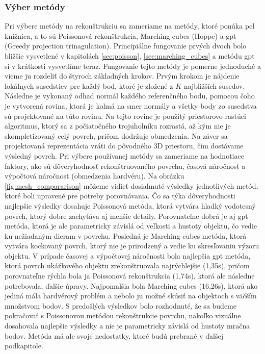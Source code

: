 \subsubsection{Výber metódy}
\noindent Pri výbere metódy na rekonštrukciu sa zameriame na metódy, ktoré ponúka \acrshort{pcl} knižnica, a to sú Poissonová rekonštrukcia, Marching cubes (Hoppe) a \acrshort{gpt} (Greedy projection trinagulation). Principiálne fungovanie prvých dvoch bolo bližšie vysvetlené v kapitolách \ref{sec:poisson}, \ref{sec:marching_cubes} a metódu \acrshort{gpt} si v krátkosti vysvetlíme teraz. 
\newline\indent Fungovanie tejto metódy je pomerne jednoduché a vieme ju rozdeliť do štyroch základných krokov. Prvým krokom je nájdenie lokálnych susedstiev pre každý bod, ktoré je zložené z $K$ najbližších susedov. Následne je vykonaný odhad normál každého referenčného bodu, pomocou čoho je vytvorená rovina, ktorá je kolmá na smer normály a všetky body zo susedstva sú projektované na túto rovinu.  Na tejto rovine je použitý priestorovo rastúci algoritmus, ktorý sa z počiatočného trojuholníku rozrastá, až kým nie je skompletizovaný celý povrch, pričom dodržuje obmedzenia. Na záver sa projektovaná reprezentácia vráti do pôvodného 3D priestoru, čím dostávame výsledný povrch. \cite{GreedyTriangulation}
\newline\indent Pri výbere používanej metódy sa zameriame na hodnotiace faktory, ako sú dôveryhodnosť rekonštruovaného povrchu, časová náročnosť a výpočtová náročnosť (obmedzenia hardvéru). Na obrázku \ref{fig:mesh_compararison} môžeme vidieť dosiahnuté výsledky jednotlivých metód, ktoré boli upravené pre potreby porovnávania. Čo sa týka dôveryhodnosti najlepšie výsledky dosahuje Poissonová metóda, ktorá vytvára hladký vodotesný povrch, ktorý dobre zachytáva aj menšie detaily. Porovnateľne dobrá je aj \acrshort{gpt} metóda, ktorá je ale parametricky závislá od veľkosti a hustoty objektu, čo vedie ku nežiadaným dieram v povrchu. Posledná je Marching cubes metóda, ktorá vytvára kockovaný povrch, ktorý nie je prirodzený a vedie ku skresľovaniu výzoru objektu.
\newline\indent V prípade časovej a výpočtovej náročnosti bola najlepšia \acrshort{gpt} metóda, ktorá povrch ukážkového objektu zrekonštruovala najrýchlejšie (1,35s), pričom porovnateľne rýchla bola ja Poissonová rekonštrukcia (1,74s), ktorá ale následne potrebovala, ďalšie úpravy. Najpomalšia bola Marching cubes (16,26s), ktorá ako jediná mála hardvérový problém a nebolo ju možné skúsiť na objektoch s väčším množstvom bodov. 
\newline\indent S predošlých výsledkov bolo rozhodnuté, že sa budeme pokračovať s Poissonovou metódou rekonštrukcie povrchu, nakoľko vizuálne dosahovala najlepšie výsledky a nie je parametricky závislá od hustoty mračna bodov. Metóda má ale svoje nedostatky, ktoré budú prebrané v ďalšej podkapitole. 


